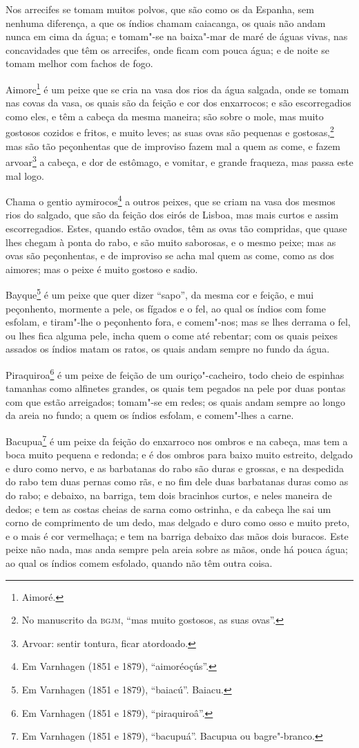\begin{linenumbers}
Nos arrecifes se tomam muitos polvos, que são como os da Espanha, sem nenhuma diferença, a
que os índios chamam caiacanga, os quais não andam nunca em cima da água; e tomam"-se na
baixa"-mar de maré de águas vivas, nas concavidades que têm os arrecifes, onde ficam com
pouca água; e de noite se tomam melhor com fachos de fogo.

Aimore\footnote{ Aimoré.} é um peixe que se cria na vasa dos rios da água salgada, onde se
tomam nas covas da vasa, os quais são da feição e cor dos enxarrocos; e são escorregadios
como eles, e têm a cabeça da mesma maneira; são sobre o mole, mas muito gostosos cozidos e
fritos, e muito leves; as suas ovas são pequenas e gostosas,\footnote{ No manuscrito da
\textsc{bgjm}, ``mas muito gostosos, as suas ovas''.} mas são tão peçonhentas que de
improviso fazem mal a quem as come, e fazem arvoar\footnote{ Arvoar: sentir tontura, ficar
atordoado.} a cabeça, e dor de estômago, e vomitar, e grande fraqueza, mas
passa este mal logo.

Chama o gentio aymirocos\footnote{ Em Varnhagen (1851 e 1879), ``aimoréoçús''.} a outros
peixes, que se criam na vasa dos mesmos rios do salgado, que são da feição dos eirós de
Lisboa, mas mais curtos e assim escorregadios. Estes, quando estão ovados, têm as ovas tão
compridas, que quase lhes chegam à ponta do rabo, e são muito saborosas, e o mesmo peixe;
mas as ovas são peçonhentas, e de improviso se acha mal quem as come, como as dos aimores;
mas o peixe é muito gostoso e sadio.

Bayque\footnote{ Em Varnhagen (1851 e 1879), ``baiacú''. Baiacu.} é um peixe que quer
dizer ``sapo'', da mesma cor e feição, e mui peçonhento, mormente a pele, os fígados e o
fel, ao qual os índios com fome esfolam, e tiram"-lhe o peçonhento fora, e comem"-nos; mas
se lhes derrama o fel, ou lhes fica alguma pele, incha quem o come até rebentar; com os
quais peixes assados os índios matam os ratos, os quais andam sempre no fundo da água.

Piraquiroa\footnote{ Em Varnhagen (1851 e 1879), ``piraquiroâ''.} é um peixe de feição de
um ouriço"-cacheiro, todo cheio de espinhas tamanhas como alfinetes grandes, os quais tem
pegados na pele por duas pontas com que estão arreigados; tomam"-se em redes; os quais
andam sempre ao longo da areia no fundo; a quem os índios esfolam, e comem"-lhes a carne.

Bacupua\footnote{ Em Varnhagen (1851 e 1879), ``bacupuá''. Bacupua ou bagre"-branco.} é um
peixe da feição do enxarroco nos ombros e na cabeça, mas tem a boca muito pequena e
redonda; e é dos ombros para baixo muito estreito, delgado e duro como nervo, e as
barbatanas do rabo são duras e grossas, e na despedida do rabo tem duas pernas como rãs, e
no fim dele duas barbatanas duras como as do rabo; e debaixo, na barriga, tem dois
bracinhos curtos, e neles maneira de dedos; e tem as costas cheias de sarna como ostrinha,
e da cabeça lhe sai um corno de comprimento de um dedo, mas delgado e duro como osso e
muito preto, e o mais é cor vermelhaça; e tem na barriga debaixo das mãos dois buracos.
Este peixe não nada, mas anda sempre pela areia sobre as mãos, onde há pouca água; ao qual
os índios comem esfolado, quando não têm outra coisa.


\end{linenumbers}
